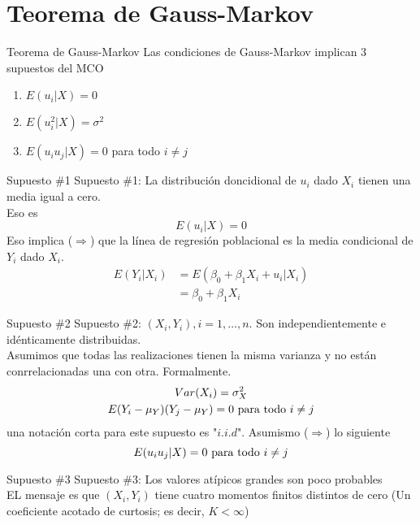 \section{Teorema de Gauss-Markov}

\begin{frame}{Teorema de Gauss-Markov}
	Las condiciones de Gauss-Markov implican 3 supuestos del MCO
		\begin{enumerate}
			\item $E(u_i|X)=0$
			\item $E(u_i^2|X)=\sigma^2$
			\item $E(u_iu_j|X)=0$ para todo $i \neq j$
		\end{enumerate}
\end{frame}

\begin{frame}{Supuesto \#1}
	Supuesto \#1: La distribución doncidional de $u_i$ dado $X_i$ tienen una media igual a cero.\\
	\medskip
	Eso es
		$$E(u_i|X)=0$$
	Eso implica ($\Longrightarrow$) que la línea de regresión poblacional es la media condicional de $Y_i$ dado $X_i$.
		\begin{align*}
			E(Y_i|X_i) & = E(\beta_0 + \beta_1 X_i + u_i|X_i)\\
					   & = \beta_0 + \beta_1 X_i
		\end{align*}
\end{frame}
\begin{frame}{Supuesto \#2}
	Supuesto \#2: $(X_i, Y_i), i=1, \ldots , n$. Son independientemente e idénticamente distribuidas.\\
	\medskip
	Asumimos que todas las realizaciones tienen la misma varianza y no están conrrelacionadas una con otra. Formalmente.
		\begin{gather*}
			Var(X_i) = \sigma_{X}^{2}\\
			E(Y_i - \mu_Y)(Y_j - \mu_Y) = 0 \textup{ para todo } i \neq j
		\end{gather*}
	una notación corta para este supuesto es "$i.i.d$". Asumismo ($\Longrightarrow$) lo siguiente
		$$E(u_iu_j|X) = 0 \textup{ para todo } i \neq j$$
\end{frame}
\begin{frame}{Supuesto \#3}
	Supuesto \#3: Los valores atípicos grandes son poco probables\\
	\medskip
	EL mensaje es que $(X_i, Y_i)$ tiene cuatro momentos finitos distintos de cero (Un coeficiente acotado de curtosis; es decir, $K<\infty$)
\end{frame}
